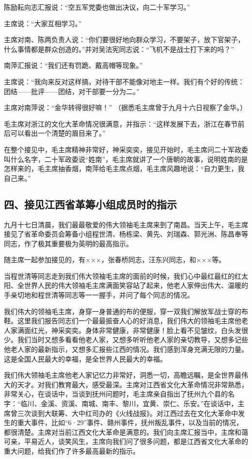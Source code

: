 陈励耘向志汇报说：“空五军党委也做出决议，向二十军学习。”

主席说：“大家互相学习。”

主席对南、陈两负责人说：“你们要很好地向群众学习，不要架子，放下官架子，什么事情都是群众创造的。”并对吴法宪同志说：“飞机不是战士打下来的吗？”

南萍汇报说：“我们还有罚跪、戴高帽等现象。”

主席说：“我向来反对这样搞，对待干部不能像对地主一样。我们有个好的传统：团结——批评——团结，对干部要一分为二。”

主席对南萍说：“金华转得很好嘛！”  （据悉毛主席曾于九月十六日视察了金华。）

毛主席对浙江的文化大革命情况很满意，并指示：“这样发展下去，浙江在春节前后可以看出一个清楚的眉目来了。”

在整个接见中，毛主席精神非常好，神采奕奕，接见开始时，毛主席问二十军政委叫什么名字，二十军政委说“姓南”，毛主席就讲了一个唐朝的故事，说明姓南的是怎样来的，毛主席抽香烟，南萍给毛主席点烟，毛主席风趣地说：“自力更生，我自己来。”


\subsection{四、接见江西省革筹小组成员时的指示}

九月十七日清晨，我们最最敬爱的伟大领袖毛主席来到了南昌。当天上午，毛主席接见了省革命委员会筹备小组程世清、杨栋梁、黄先、刘瑞森、郭光洲、陈昌奉等同志，作了极其重要极为英明的最高指示。

随主席一起参加接见的，有×××，张春桥同志，汪东兴同志，和×××等。

当程世清等同志走到我们伟大领袖毛主席的面前的时候，我们心中最红最红的红太阳、全世界人民的伟大领袖毛主席满面笑容站了起来，他老人家伸出伟大、温暖的手亲切地和程世清等同志等一一握手，并问了每个同志的情况。

我们伟大的领袖毛主席，身穿一身普通的布的便服，穿一双我们解放军战士穿的布鞋。这里我们报告同志们一个最最振奋人心的好消息，我们伟大的领袖毛主席他老人家满面红光，神采奕奕。身体非常健康，非常健康！脸上看不见皱纹，白头发很少。我们当时又想多看看他老人家，又想多听听他老人家的亲切教导，又想多记些他老人家的最新指示，又想多汇报些江西的情况。我们感到浑身充满无限的力量。这是全国人民最大的幸福，是全世界人民最大的幸福。

我们伟大领袖毛主席他老人家记忆力非常好，洞悉一切，高瞻远瞩，是全世界最伟大的天才。对我们教育最大，感受最深。主席对江西省文化大革命情况非常熟悉，非常关心，在谈话中，当谈到抚州问题时，毛主席亲自指出了抚州九个县的名字：“临川、金溪、资溪、南城、南丰、黎川，宜黄、崇仁、乐安。”在谈话中，主席曾三次谈到大联筹、大中红司办的《火线战报》。对江西过去在文化大革命中发生的重大事件，比如“6·29”事件、赣州事件，抚州叛乱事件，以及当前的情况，都很清楚。主席对当前江西文化大革命是满意的。我们向主席汇报当中，主席和蔼可亲，平易近人，谈笑风生，主席向我们问了很多问题，都是江西省文化大革命的重大问题，给我们作了许多最高最新的指示。

